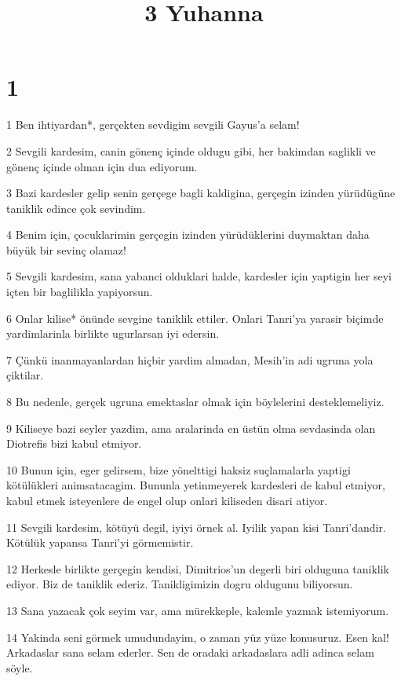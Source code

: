 

\title{3 Yuhanna}


\chapter{1}

\par 1 Ben ihtiyardan*, gerçekten sevdigim sevgili Gayus'a selam!
\par 2 Sevgili kardesim, canin gönenç içinde oldugu gibi, her bakimdan saglikli ve gönenç içinde olman için dua ediyorum.
\par 3 Bazi kardesler gelip senin gerçege bagli kaldigina, gerçegin izinden yürüdügüne taniklik edince çok sevindim.
\par 4 Benim için, çocuklarimin gerçegin izinden yürüdüklerini duymaktan daha büyük bir sevinç olamaz!
\par 5 Sevgili kardesim, sana yabanci olduklari halde, kardesler için yaptigin her seyi içten bir baglilikla yapiyorsun.
\par 6 Onlar kilise* önünde sevgine taniklik ettiler. Onlari Tanri'ya yarasir biçimde yardimlarinla birlikte ugurlarsan iyi edersin.
\par 7 Çünkü inanmayanlardan hiçbir yardim almadan, Mesih'in adi ugruna yola çiktilar.
\par 8 Bu nedenle, gerçek ugruna emektaslar olmak için böylelerini desteklemeliyiz.
\par 9 Kiliseye bazi seyler yazdim, ama aralarinda en üstün olma sevdasinda olan Diotrefis bizi kabul etmiyor.
\par 10 Bunun için, eger gelirsem, bize yönelttigi haksiz suçlamalarla yaptigi kötülükleri animsatacagim. Bununla yetinmeyerek kardesleri de kabul etmiyor, kabul etmek isteyenlere de engel olup onlari kiliseden disari atiyor.
\par 11 Sevgili kardesim, kötüyü degil, iyiyi örnek al. Iyilik yapan kisi Tanri'dandir. Kötülük yapansa Tanri'yi görmemistir.
\par 12 Herkesle birlikte gerçegin kendisi, Dimitrios'un degerli biri olduguna taniklik ediyor. Biz de taniklik ederiz. Tanikligimizin dogru oldugunu biliyorsun.
\par 13 Sana yazacak çok seyim var, ama mürekkeple, kalemle yazmak istemiyorum.
\par 14 Yakinda seni görmek umudundayim, o zaman yüz yüze konusuruz. Esen kal! Arkadaslar sana selam ederler. Sen de oradaki arkadaslara adli adinca selam söyle.



